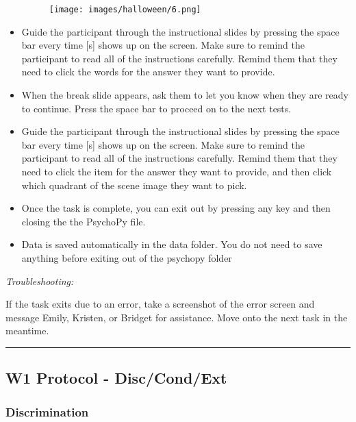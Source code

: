 \documentclass[
]{book}
\begin{document}
\begin{itemize}
  \begin{figure}
  \centering
  \texttt{[image: images/halloween/6.png]}
  \caption{}
  \end{figure}
\item
  Guide the participant through the instructional slides by pressing the space bar every time {[}s{]} shows up on the screen. Make sure to remind the participant to read all of the instructions carefully. Remind them that they need to click the words for the answer they want to provide.
\item
  When the break slide appears, ask them to let you know when they are ready to continue. Press the space bar to proceed on to the next tests.
\item
  Guide the participant through the instructional slides by pressing the space bar every time {[}s{]} shows up on the screen. Make sure to remind the participant to read all of the instructions carefully. Remind them that they need to click the item for the answer they want to provide, and then click which quadrant of the scene image they want to pick.
\item
  Once the task is complete, you can exit out by pressing any key and then closing the the PsychoPy file.
\item
  Data is saved automatically in the data folder. You do not need to save anything before exiting out of the psychopy folder
\end{itemize}

\emph{Troubleshooting:}

If the task exits due to an error, take a screenshot of the error screen and message Emily, Kristen, or Bridget for assistance. Move onto the next task in the meantime.

\begin{center}\rule{0.5\linewidth}{0.5pt}\end{center}

\hypertarget{w1-protocol---disccondext}{%
\subsection{W1 Protocol - Disc/Cond/Ext}\label{w1-protocol---disccondext}}

\hypertarget{discrimination}{%
\subsubsection{Discrimination}\label{discrimination}}
\end{document}

